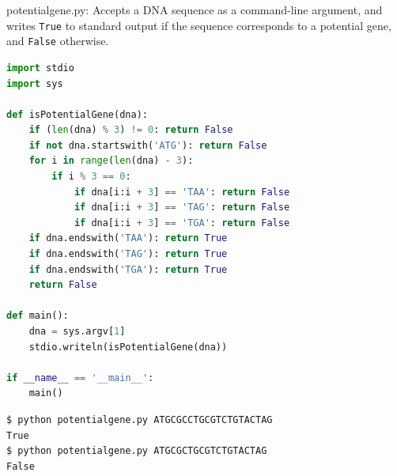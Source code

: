 \documentclass[8pt,a4paper,compress,handout]{beamer}
\begin{document}
\begin{frame}[fragile]
\begin{framed}
\tiny potentialgene.py: Accepts a DNA sequence as a command-line argument, and writes \lstinline{True} to standard output if the sequence corresponds to a potential gene, and \lstinline{False} otherwise.
\end{framed}

\begin{lstlisting}[language=Python]
import stdio
import sys

def isPotentialGene(dna):
    if (len(dna) % 3) != 0: return False
    if not dna.startswith('ATG'): return False
    for i in range(len(dna) - 3):
        if i % 3 == 0:
            if dna[i:i + 3] == 'TAA': return False
            if dna[i:i + 3] == 'TAG': return False
            if dna[i:i + 3] == 'TGA': return False
    if dna.endswith('TAA'): return True
    if dna.endswith('TAG'): return True
    if dna.endswith('TGA'): return True
    return False

def main():
    dna = sys.argv[1]
    stdio.writeln(isPotentialGene(dna))

if __name__ == '__main__':
    main()
\end{lstlisting}

\begin{lstlisting}[language={}]
$ python potentialgene.py ATGCGCCTGCGTCTGTACTAG
True
$ python potentialgene.py ATGCGCTGCGTCTGTACTAG
False
\end{lstlisting}
\end{frame}
\end{document}
